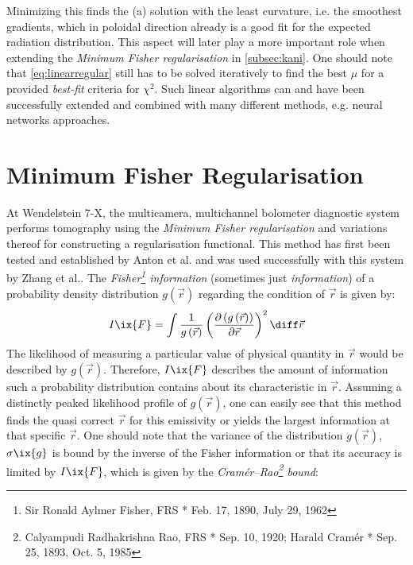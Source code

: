 %
    Minimizing this finds the (a) solution with the least curvature, i.e. the smoothest gradients, which in poloidal direction already is a good fit for the expected radiation distribution. This aspect will later play a more important role when extending the \textit{Minimum Fisher regularisation} in \cref{subsec:kani}. One should note that \cref{eq:linearregular} still has to be solved iteratively to find the best $\mu$ for a provided \textit{best-fit} criteria for $\chi^{2}$. Such linear algorithms can and have been successfully extended and combined with many different methods, e.g. neural networks approaches\cite{Parker1977,Peng1993,Steriti1992}.%
%
    \section{Minimum Fisher Regularisation}\label{sec:minfisher}%
%
        At Wendelstein 7-X, the multicamera, multichannel bolometer diagnostic system performs tomography using the \textit{Minimum Fisher regularisation} and variations thereof for constructing a regularisation functional. This method has first been tested and established by Anton et al.\cite{Anton1996} and was used successfully with this system by Zhang et al.\cite{Zhang2013}. The \textit{Fisher\footnote[1]{Sir Ronald Aylmer Fisher, FRS * Feb. 17, 1890, \textdagger July 29, 1962} information} (sometimes just \textit{information}) of a probability density distribution $g\left(\vec{r}\right)$ regarding the condition of $\vec{r}$ is given by:
%
        \begin{align}%
            I\ix{F}=\int\frac{1}{g\left(\vec{r}\right)}\left(\frac{\partial\left(g\left(\vec{r}\right)\right)}{\partial\vec{r}}\right)^{2}\diff\vec{r}%
        \end{align}\label{eq:fisherinfo}%
%
        The likelihood of measuring a particular value of physical quantity in $\vec{r}$ would be described by $g\left(\vec{r}\right)$. Therefore, $I\ix{F}$ describes the amount of information such a probability distribution contains about its characteristic in $\vec{r}$. Assuming a distinctly peaked likelihood profile of $g\left(\vec{r}\right)$, one can easily see that this method finds the quasi correct $\vec{r}$ for this emissivity or yields the largest information at that specific $\vec{r}$\cite{Fisher1922}. One should note that the variance of the distribution $g\left(\vec{r}\right)$, $\sigma\ix{g}$ is bound by the inverse of the Fisher information or that its accuracy is limited by $I\ix{F}$, which is given by the \textit{Cramér–Rao\footnote[2]{Calyampudi Radhakrishna Rao, FRS * Sep. 10, 1920; Harald Cramér * Sep. 25, 1893, \textdagger Oct. 5, 1985} bound}:%
